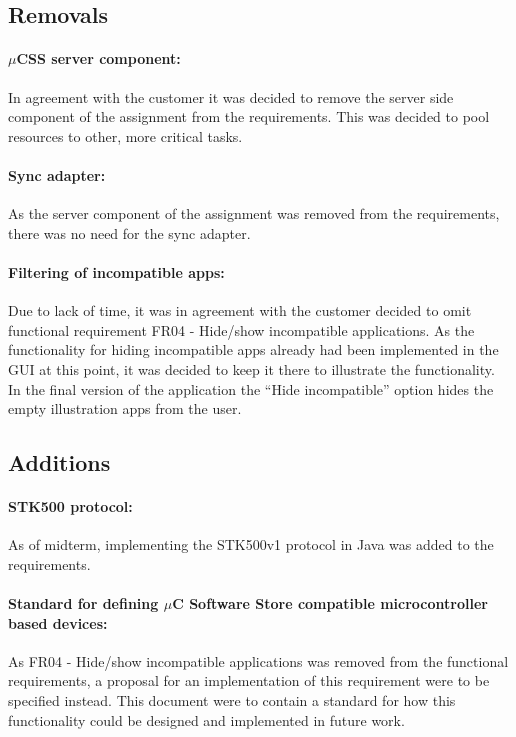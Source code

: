 \subsection{Removals}
\label{removals}
\paragraph{$\mu$CSS server component:} In agreement with the customer it was decided to remove the server side component of the assignment from the requirements. This was decided to pool resources to other, more critical tasks.

\paragraph{Sync adapter:} As the server component of the assignment was removed from the requirements, there was no need for the sync adapter.

\paragraph{Filtering of incompatible apps:} Due to lack of time, it was in agreement with the customer decided to omit functional requirement FR04 - Hide/show incompatible applications. As the functionality for hiding incompatible apps already had been implemented in the GUI at this point, it was decided to keep it there to illustrate the functionality. In the final version of the application the ``Hide incompatible'' option hides the empty illustration apps from the user.

\subsection{Additions}
\paragraph{STK500 protocol:} As of midterm, implementing the STK500v1 protocol in Java was added to the requirements.

\paragraph{Standard for defining $\mu$C Software Store compatible microcontroller based devices:} As FR04 - Hide/show incompatible applications was removed from the functional requirements, a proposal for an implementation of this requirement were to be specified instead. This document were to contain a standard for how this functionality could be designed and implemented in future work.

